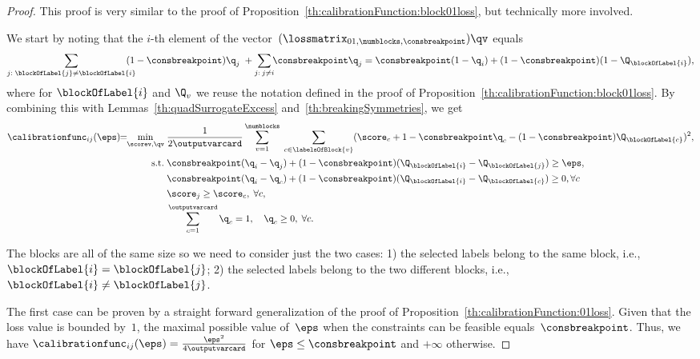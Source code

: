 \documentclass{article}
\begin{document}
\begin{proof}
    This proof is very similar to the proof of Proposition~\ref{th:calibrationFunction:block01loss}, but technically more involved.
    
    We start by noting that the $i$-th element of the vector~$(\lossmatrix_{01,\numblocks,\consbreakpoint}) \qv$ equals
    \begin{equation}
    \label{eq:calibrationFunction:mixedLoss:expectedLoss}
    \sum_{j:\;\blockOfLabel{j}\neq \blockOfLabel{i}} \!\!\!\!\!\! (1-\consbreakpoint)\q_j\; + \sum_{j:\:j\neq i}\!\! \consbreakpoint \q_j  
    = 
    \consbreakpoint(1-\q_i) + (1-\consbreakpoint)(1-\Q_{\blockOfLabel{i}}),
    \end{equation}
    where for $\blockOfLabel{i}$ and $\Q_v$ we reuse the notation defined in the proof of Proposition~\ref{th:calibrationFunction:block01loss}.
    By combining this with Lemmas~\ref{th:quadSurrogateExcess} and~\ref{th:breakingSymmetries}, we get
    \begin{align}
    \label{eq:calibrationFunction:mixedLoss:proofSquare:obj1}
    \calibrationfunc_{ij}(\eps) \!\!=\!\! \min_{\scorev, \qv} \; & \frac{1}{2\outputvarcard} \sum_{v=1}^\numblocks \;\sum_{c \in\labelsOfBlock{v}} (\score_c + 1 - \consbreakpoint \q_c - (1-\consbreakpoint)\Q_{\blockOfLabel{c}})^2, \\
    \notag \mbox{s.t.} \;& \consbreakpoint (\q_i - \q_j) + (1-\consbreakpoint)(\Q_{\blockOfLabel{i}} - \Q_{\blockOfLabel{j}}) \geq \eps, \\
    \notag & \consbreakpoint (\q_i - \q_c) + (1-\consbreakpoint)(\Q_{\blockOfLabel{i}} - \Q_{\blockOfLabel{c}}) \geq 0, \forall c \\
    \notag & \score_{j} \geq \score_c, \; \forall c, \\
    \notag & \sum_{c=1}^\outputvarcard \q_c = 1, \quad \q_c \geq 0, \; \forall c.
    \end{align}
    
    The blocks are all of the same size so we need to consider just the two cases: 1) the selected labels belong to the same block, i.e., $\blockOfLabel{i} = \blockOfLabel{j}$; 2) the selected labels belong to the two different blocks, i.e., $\blockOfLabel{i} \neq \blockOfLabel{j}$.
    
    The first case can be proven by a straight forward generalization of the proof of Proposition~\ref{th:calibrationFunction:01loss}.
    Given that the loss value is bounded by~$1$, the maximal possible value of~$\eps$ when the constraints can be feasible equals~$\consbreakpoint$.
    Thus, we have $\calibrationfunc_{ij}(\eps) = \frac{\eps^2}{4\outputvarcard}$ for $\eps \leq \consbreakpoint$ and $+\infty$ otherwise.
    

\end{proof}
\end{document}
